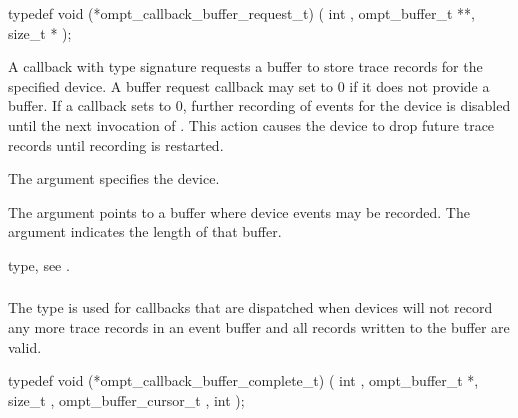 \format
\begin{ccppspecific}
\begin{omptCallback}
typedef void (*ompt_callback_buffer_request_t) (
  int ,
  ompt_buffer_t **,
  size_t *
);
\end{omptCallback}
\end{ccppspecific}

\descr
A callback with type signature   requests 
a buffer to store trace records for the specified device. A buffer request 
callback may set  to 0 if it does not provide a buffer. If a 
callback sets  to 0, further recording of events for the device is
disabled until the next invocation of . This action
causes the device to drop future trace records until recording is restarted.

\argdesc
The  argument specifies the device.

The  argument points to a buffer where device events may be 
recorded. The  argument indicates the length of that buffer.

\begin{crossrefs}
\item {} type, see .
\end{crossrefs}



\subsubsection{}
\label{sec:ompt_callback_buffer_complete_t}

\summary
The  type is used for callbacks that are
dispatched when devices will not record any more trace records in an event buffer 
and all records written to the buffer are valid.

\format
\begin{ccppspecific}
\begin{omptCallback}
typedef void (*ompt_callback_buffer_complete_t) (
  int ,
  ompt_buffer_t *,
  size_t ,
  ompt_buffer_cursor_t ,
  int 
);
\end{omptCallback}
\end{ccppspecific}

